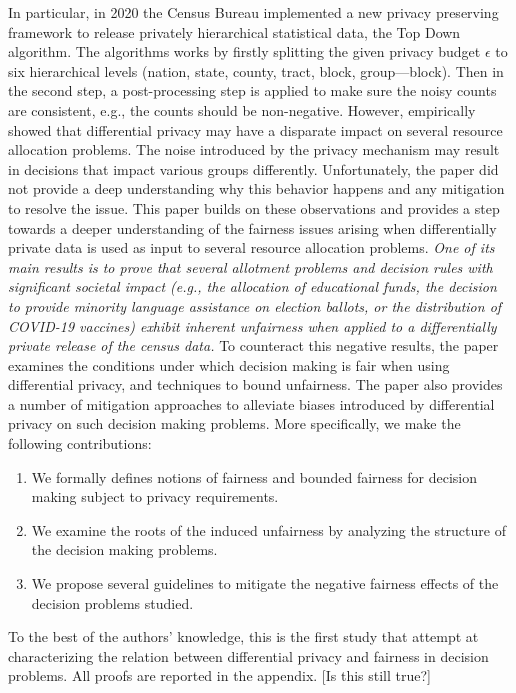 In particular, in 2020 the Census Bureau implemented a new privacy preserving framework to release privately hierarchical
statistical data, the Top Down algorithm. The algorithms works by firstly splitting the given privacy budget $\epsilon$ to six
hierarchical levels (nation, state, county, tract, block, group—block). Then in the second step, a post-processing step
is applied to make sure the noisy counts are consistent, e.g., the counts should be non-negative.
However, \cite{pujol:20} empirically showed that differential privacy may have a disparate impact on several resource
allocation problems. The noise introduced by the privacy mechanism may result in decisions that impact various groups differently.
Unfortunately, the paper did not provide a deep understanding why this behavior happens and any mitigation to resolve the issue.
This paper builds on these observations and provides a step towards a deeper understanding of the fairness issues arising when
differentially private data is used as input to several resource allocation problems.
	{\em One of its main results
is to prove that several allotment problems and decision rules with significant societal impact (e.g., the allocation of
educational funds, the decision to provide minority language assistance on election ballots, or the distribution of
COVID-19 vaccines) exhibit inherent unfairness when applied to a differentially private release of the census
data.} To counteract this negative results, the paper examines the conditions under which decision making is fair when
using differential privacy, and techniques to bound unfairness. The paper also provides a number of mitigation
approaches to alleviate biases introduced by differential privacy on such decision making problems. More specifically,
we make the following contributions:

\begin{enumerate}[leftmargin=*,labelsep=2pt,itemsep=0pt,parsep=2pt,topsep=2pt]

	\item We formally defines notions of fairness and bounded fairness for decision making
	subject to privacy requirements.

	\item We examine the roots of the induced unfairness by analyzing the structure
	of the decision making problems.

	\item We propose several guidelines to mitigate the negative
	fairness effects of the decision problems studied.
\end{enumerate}

To the best of the authors' knowledge, this is the first study that
attempt at characterizing the relation between differential privacy
and fairness in decision problems. All proofs are reported in the
appendix. [Is this still true?]
